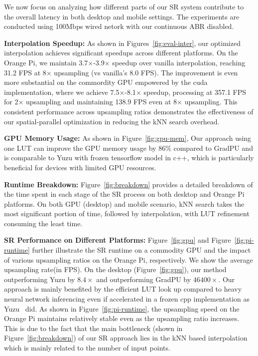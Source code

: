 We now focus on analyzing how different parts of our SR system contribute to the overall latency in both desktop and mobile settings. The experiments are conducted using 100Mbps wired netork with our continuous ABR disabled.

\textbf{Interpolation Speedup:} As shown in Figures~\ref{fig:eval-inter}, our optimized interpolation achieves significant speedups across different platforms. On the Orange Pi, we maintain 3.7$\times$-3.9$\times$ speedup over vanilla interpolation, reaching 31.2 FPS at 8$\times$ upsampling (vs vanilla's 8.0 FPS). The improvement is even more substantial on the commordity GPU empowered by the cuda implementation, where we achieve 7.5$\times$-8.1$\times$ speedup, processing at 357.1 FPS for 2$\times$ upsampling and maintaining 138.9 FPS even at 8$\times$ upsampling. This consistent performance across upsampling ratios demonstrates the effectiveness of our spatial-parallel optimization in reducing the kNN search overhead.


\textbf{GPU Memory Usage:} As shown in Figure~\ref{fig:gpu-mem},  Our approach using one LUT can improve the GPU memory usage by 86\% compared to GradPU and is comparable to Yuzu with frozen tensorflow model in c++, which is particularly beneficial for devices with limited GPU resources.

\textbf{Runtime Breakdown:} Figure~\ref{fig:breakdown} provides a detailed breakdown of the time spent in each stage of the SR process on both desktop and Orange Pi platforms. On both GPU (desktop) and mobile scenario, kNN search takes the most significant portion of time, followed by interpolation, with LUT refinement consuming the least time.

\textbf{SR Performance on Different Platforms:} Figure~\ref{fig:gpu} and Figure~\ref{fig:pi-runtime} further illustrate the SR runtime on a commodity GPU and the impact of various upsampling ratios on the Orange Pi, respectively. We show the average upsampling rate(in FPS). On the desktop (Figure~\ref{fig:gpu}), our method outperforming Yuzu by $8.4\times$ and outperforming GradPU by $46400\times$. Our approach is mainly benefited by the efficient LUT look up compared to heavy neural network inferencing even if accelerated in a frozen cpp implementation as Yuzu~\cite{zhang_yuzu_nodate} did.  As shown in Figure~\ref{fig:pi-runtime}, the upsampling speed on the Orange Pi maintains relatively stable even as the upsampling ratio increases. This is due to the fact that the main bottleneck (shown in Figure~\ref{fig:breakdown}) of our SR approach lies in the kNN based interpolation which is mainly related to the number of input points.

